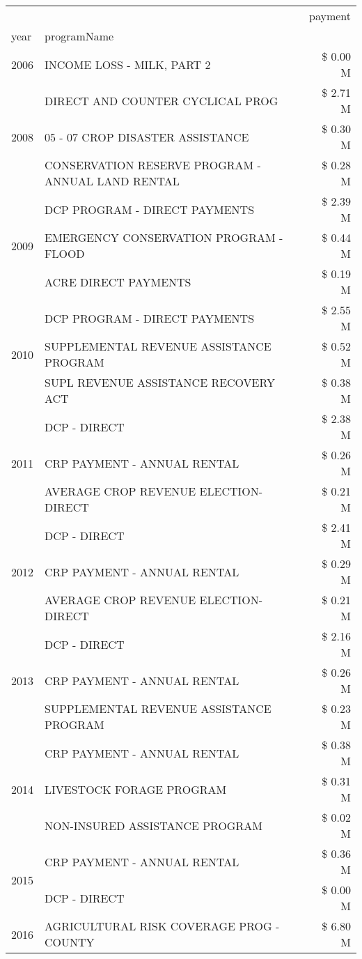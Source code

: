 \begin{tabular}{llr}
\toprule
 &  & payment \\
year & programName &  \\
\midrule
2006 & INCOME LOSS - MILK, PART 2 & \$ 0.00 M \\
\cline{1-3}
\multirow[t]{3}{*}{2008} & DIRECT AND COUNTER CYCLICAL PROG & \$ 2.71 M \\
 & 05 - 07 CROP DISASTER ASSISTANCE & \$ 0.30 M \\
 & CONSERVATION RESERVE PROGRAM - ANNUAL LAND RENTAL & \$ 0.28 M \\
\cline{1-3}
\multirow[t]{3}{*}{2009} & DCP PROGRAM - DIRECT PAYMENTS & \$ 2.39 M \\
 & EMERGENCY CONSERVATION PROGRAM - FLOOD & \$ 0.44 M \\
 & ACRE DIRECT PAYMENTS & \$ 0.19 M \\
\cline{1-3}
\multirow[t]{3}{*}{2010} & DCP PROGRAM - DIRECT PAYMENTS & \$ 2.55 M \\
 & SUPPLEMENTAL REVENUE ASSISTANCE PROGRAM & \$ 0.52 M \\
 & SUPL REVENUE ASSISTANCE RECOVERY ACT & \$ 0.38 M \\
\cline{1-3}
\multirow[t]{3}{*}{2011} & DCP - DIRECT & \$ 2.38 M \\
 & CRP PAYMENT - ANNUAL RENTAL & \$ 0.26 M \\
 & AVERAGE CROP REVENUE ELECTION-DIRECT & \$ 0.21 M \\
\cline{1-3}
\multirow[t]{3}{*}{2012} & DCP - DIRECT & \$ 2.41 M \\
 & CRP PAYMENT - ANNUAL RENTAL & \$ 0.29 M \\
 & AVERAGE CROP REVENUE ELECTION-DIRECT & \$ 0.21 M \\
\cline{1-3}
\multirow[t]{3}{*}{2013} & DCP - DIRECT & \$ 2.16 M \\
 & CRP PAYMENT - ANNUAL RENTAL & \$ 0.26 M \\
 & SUPPLEMENTAL REVENUE ASSISTANCE PROGRAM & \$ 0.23 M \\
\cline{1-3}
\multirow[t]{3}{*}{2014} & CRP PAYMENT - ANNUAL RENTAL & \$ 0.38 M \\
 & LIVESTOCK FORAGE PROGRAM & \$ 0.31 M \\
 & NON-INSURED ASSISTANCE PROGRAM & \$ 0.02 M \\
\cline{1-3}
\multirow[t]{2}{*}{2015} & CRP PAYMENT - ANNUAL RENTAL & \$ 0.36 M \\
 & DCP - DIRECT & \$ 0.00 M \\
\cline{1-3}
\multirow[t]{3}{*}{2016} & AGRICULTURAL RISK COVERAGE PROG - COUNTY      & \$ 6.80 M \\

\end{tabular}
